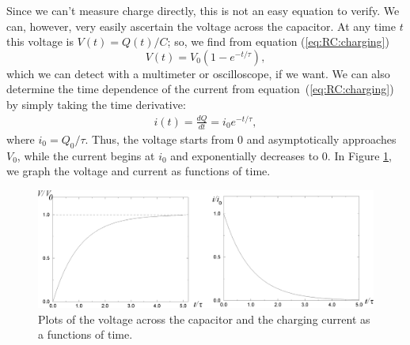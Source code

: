 Since we can't measure charge directly, this is not an easy equation to 
verify. We can, however, very easily ascertain the voltage across the 
capacitor. At any time $t$ this voltage is $V(t)=Q(t)/C$; so, we find from 
equation (\ref{eq:RC:charging})
\begin{equation}
V(t) = V_0(1-e^{-t/\tau}), \label{eq:RC:chargingv}
\end{equation}
which we can detect with a multimeter or oscilloscope, if we want. We can also 
determine the time dependence of the current from 
equation~(\ref{eq:RC:charging}) by simply taking the time derivative:
\begin{eqnarray*}
i(t) = \frac{dQ}{dt} = i_0 e^{-t/\tau},
\end{eqnarray*}
where $i_0=Q_0/\tau$. Thus, the voltage starts from $0$ and asymptotically 
approaches $V_0$, while the current begins at $i_0$ and exponentially 
decreases to $0$. In Figure \ref{fig:RC:chargingiv}, we 
graph the voltage and current as functions of time.
\begin{figure}[htb]
\centering 
\epsfxsize=8cm \includegraphics[scale=0.4]{5_rccircuits/chargevi.eps}
\caption{Plots of the voltage across the capacitor and the charging current 
as a functions of time.}
\label{fig:RC:chargingiv}
\end{figure}

